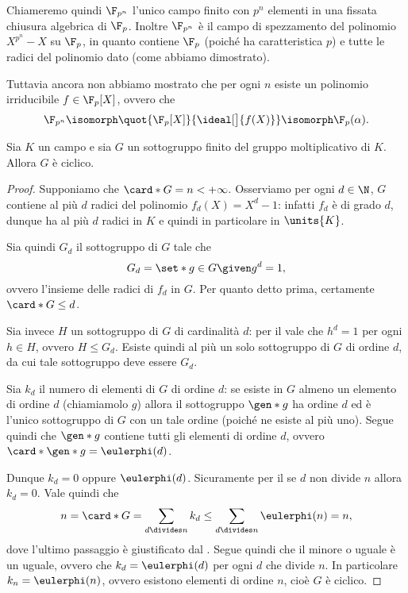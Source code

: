Chiameremo quindi $\F_{p^n}$ l'unico campo finito con $p^n$ elementi in una fissata chiusura algebrica di $\F_p$. Inoltre $\F_{p^n}$ è il campo di spezzamento del polinomio $X^{p^n} - X$ su $\F_p$, in quanto contiene $\F_p$ (poiché ha caratteristica $p$) e tutte le radici del polinomio dato (come abbiamo dimostrato).

Tuttavia ancora non abbiamo mostrato che per ogni $n$ esiste un polinomio irriducibile $f \in \F_p[X]$, ovvero che \[
    \F_{p^n} \isomorph \quot{\F_p[X]}{\ideal[\big]{f(X)}} \isomorph \F_p(\alpha).    
\]

\begin{theorem}
    Sia $K$ un campo e sia $G$ un sottogruppo finito del gruppo moltiplicativo di $K$. Allora $G$ è ciclico.
\end{theorem}
\begin{proof}
    Supponiamo che $\card*{G} = n < +\infty$. Osserviamo per ogni $d \in \N$, $G$ contiene al più $d$ radici del polinomio $f_d(X) = X^d - 1$: infatti $f_d$ è di grado $d$, dunque ha al più $d$ radici in $K$ e quindi in particolare in $\units{K}$. 

    Sia quindi $G_d$ il sottogruppo di $G$ tale che \[
        G_d = \set*{g \in G \given g^d = 1},    
    \] ovvero l'insieme delle radici di $f_d$ in $G$. Per quanto detto prima, certamente $\card*{G} \leq d$.

    Sia invece $H$ un sottogruppo di $G$ di cardinalità $d$: per il  vale che $h^d = 1$ per ogni $h \in H$, ovvero $H \leq G_d$. Esiste quindi al più un solo sottogruppo di $G$ di ordine $d$, da cui tale sottogruppo deve essere $G_d$.

    Sia $k_d$ il numero di elementi di $G$ di ordine $d$: se esiste in $G$ almeno un elemento di ordine $d$ (chiamiamolo $g$) allora il sottogruppo $\gen*{g}$ ha ordine $d$ ed è l'unico sottogruppo di $G$ con un tale ordine (poiché ne esiste al più uno). Segue quindi che $\gen*{g}$ contiene tutti gli elementi di ordine $d$, ovvero $\card*{\gen*{g}} = \eulerphi(d)$.

    Dunque $k_d = 0$ oppure $\eulerphi(d)$. Sicuramente per il  se $d$ non divide $n$ allora $k_d = 0$. Vale quindi che \[
        n = \card*{G} = \sum_{d \divides n} k_d \leq \sum_{d \divides n} \eulerphi(n) = n,    
    \] dove l'ultimo passaggio è giustificato dal . Segue quindi che il minore o uguale è un uguale, ovvero che $k_d = \eulerphi(d)$ per ogni $d$ che divide $n$. In particolare $k_n = \eulerphi(n)$, ovvero esistono elementi di ordine $n$, cioè $G$ è ciclico.
\end{proof}

